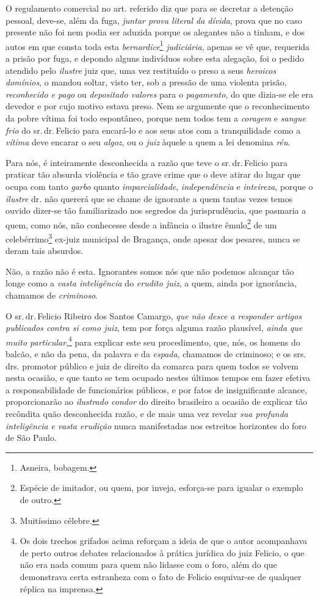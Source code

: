 O regulamento comercial no art. referido diz que para se decretar a
detenção pessoal, deve-se, além da fuga, \emph{juntar prova literal da
dívida}, prova que no caso presente não foi nem podia ser aduzida porque
os alegantes não a tinham, e dos autos em que consta toda esta
\emph{bernardice}\footnote{ Asneira, bobagem.} \emph{judiciária},
apenas se vê que, requerida a prisão por fuga, e depondo alguns
indivíduos sobre esta alegação, foi o pedido atendido pelo
\emph{ilustre} juiz que, uma vez restituído o preso a seus
\emph{heroicos domínios}, o mandou soltar, visto ter, sob a pressão de
uma violenta prisão, \emph{reconhecido e pago} ou \emph{depositado
valores} para o \emph{pagamento}, do que dizia-se ele era devedor e por
cujo motivo estava preso. Nem se argumente que o reconhecimento da pobre
vítima foi todo espontâneo, porque nem todos tem a \emph{coragem} e
\emph{sangue frio} do sr.\,dr.\,Felicio para encará-lo e aos seus atos com
a tranquilidade como a \emph{vítima} deve encarar o seu \emph{algoz}, ou
o \emph{juiz} àquele a quem a lei denomina \emph{réu}.

Para nós, é inteiramente desconhecida a razão que teve o sr.\,dr.\,Felicio
para praticar tão absurda violência e tão grave crime que o deve atirar
do lugar que ocupa com tanto \emph{garbo} quanto \emph{imparcialidade},
\emph{independência} e \emph{inteireza}, porque o \emph{ilustre} dr. não
quererá que se chame de ignorante a quem tantas vezes temos ouvido
dizer-se tão familiarizado nos segredos da jurisprudência, que pasmaria
a quem, como nós, não conhecesse desde a infância o ilustre
êmulo\footnote{ Espécie de imitador, ou quem, por inveja, esforça-se
  para igualar o exemplo de outro.} de um celebérrimo\footnote{
  Muitíssimo célebre.} ex-juiz municipal de Bragança, onde apesar dos
pesares, nunca se deram tais absurdos.

Não, a razão não é esta. Ignorantes somos nós que não podemos alcançar
tão longe como a \emph{vasta inteligência} do \emph{erudito juiz}, a
quem, ainda por ignorância, chamamos de \emph{criminoso}.

O sr.\,dr.\,Felicio Ribeiro dos Santos Camargo, \emph{que não desce a
responder artigos publicados contra si como juiz}, tem por força alguma
razão plausível, \emph{ainda que muito particular},\footnote{ Os dois
  trechos grifados acima reforçam a ideia de que o autor acompanhava de
  perto outros debates relacionados à prática jurídica do juiz Felicio,
  o que não era nada comum para quem não lidasse com o foro, além do que
  demonstrava certa estranheza com o fato de Felicio esquivar-se de
  qualquer réplica na imprensa.} para explicar este seu procedimento,
que, nós, os homens do balcão, e não da pena, da palavra e da
\emph{espada}, chamamos de criminoso; e os srs. drs. promotor público e
juiz de direito da comarca para quem todos se volvem nesta ocasião, e
que tanto se tem ocupado nestes últimos tempos em fazer efetiva a
responsabilidade de funcionários públicos, e por fatos de insignificante
alcance, proporcionarão ao \emph{ilustrado condor} do direito brasileiro
a ocasião de explicar tão recôndita quão desconhecida razão, e de mais
uma vez revelar \emph{sua profunda inteligência} \emph{e vasta erudição}
nunca manifestadas nos estreitos horizontes do foro de São Paulo.


